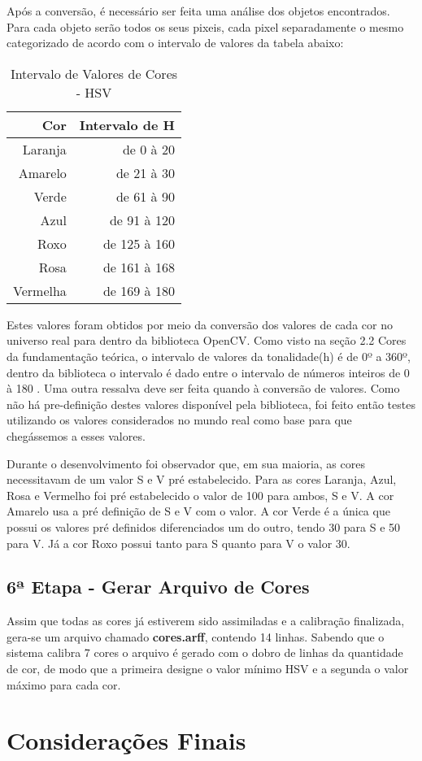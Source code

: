 Após a conversão, é necessário ser feita uma análise dos objetos encontrados. Para cada objeto serão todos os seus pixeis, cada pixel separadamente o mesmo categorizado de acordo com o intervalo de valores da tabela abaixo:

\begin{table}[H]
\centering
\begin{tabular}{r|r}
Cor & Intervalo de H \\ %
\hline                               %
Laranja & de 0 à 20 \\
\hline 
Amarelo & de 21 à 30\\
\hline 
Verde & de 61 à 90 \\
\hline 
Azul& de 91 à 120 \\
\hline 
Roxo & de 125 à 160 \\
\hline 
Rosa & de 161 à 168 \\
\hline 
Vermelha & de 169 à 180 \\
\hline 
\end{tabular}
\caption{Intervalo de Valores de Cores - HSV}
\end{table}

Estes valores foram obtidos por meio da conversão dos valores de cada cor no universo real para dentro da biblioteca OpenCV. Como visto na seção 2.2 Cores da fundamentação teórica, o intervalo de valores da tonalidade(h) é de 0º a 360º, dentro da biblioteca o intervalo é dado entre o intervalo de números inteiros de 0 à 180 . Uma outra ressalva deve ser feita quando à conversão de valores. Como não há pre-definição destes valores disponível pela biblioteca, foi feito então testes utilizando os valores considerados no mundo real como base para que chegássemos a esses valores.

Durante o desenvolvimento foi observador que, em sua maioria, as cores necessitavam de um valor S e V pré estabelecido. Para as cores Laranja, Azul, Rosa e Vermelho foi pré estabelecido o valor de 100 para ambos, S e V. A cor Amarelo usa a pré definição de S e V com o valor. A cor Verde é a única que possui os valores pré definidos diferenciados um do outro, tendo 30 para S e 50 para V. Já a cor Roxo possui tanto para S quanto para V o valor 30.

  \subsection{6ª Etapa - Gerar Arquivo de Cores}
  Assim que todas as cores já estiverem sido assimiladas e a calibração finalizada, gera-se um arquivo chamado \textbf{cores.arff}, contendo 14 linhas. Sabendo que o sistema calibra 7 cores o arquivo é gerado com o dobro de linhas da quantidade de cor, de modo que a primeira designe o valor mínimo HSV e a segunda o valor máximo para cada cor.

\section{Considerações Finais}